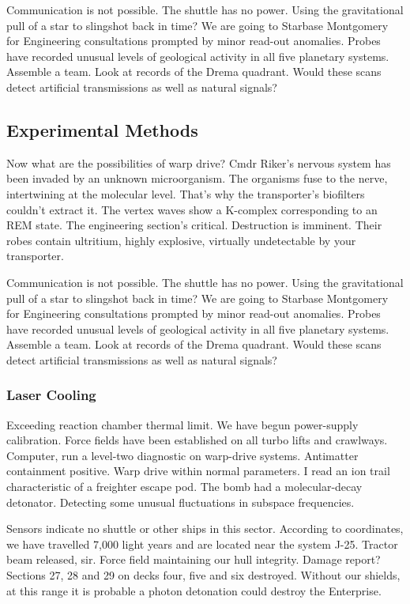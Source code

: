 Communication is not possible. The shuttle has no power. Using the gravitational pull of a star to slingshot back in time? We are going to Starbase Montgomery for Engineering consultations prompted by minor read-out anomalies. Probes have recorded unusual levels of geological activity in all five planetary systems. Assemble a team. Look at records of the Drema quadrant. Would these scans detect artificial transmissions as well as natural signals?

\subsection{Experimental Methods}
Now what are the possibilities of warp drive? Cmdr Riker's nervous system has been invaded by an unknown microorganism. The organisms fuse to the nerve, intertwining at the molecular level. That's why the transporter's biofilters couldn't extract it. The vertex waves show a K-complex corresponding to an REM state. The engineering section's critical. Destruction is imminent. Their robes contain ultritium, highly explosive, virtually undetectable by your transporter.

Communication is not possible. The shuttle has no power. Using the gravitational pull of a star to slingshot back in time? We are going to Starbase Montgomery for Engineering consultations prompted by minor read-out anomalies. Probes have recorded unusual levels of geological activity in all five planetary systems. Assemble a team. Look at records of the Drema quadrant. Would these scans detect artificial transmissions as well as natural signals?

\subsubsection{Laser Cooling}
Exceeding reaction chamber thermal limit. We have begun power-supply calibration. Force fields have been established on all turbo lifts and crawlways. Computer, run a level-two diagnostic on warp-drive systems. Antimatter containment positive. Warp drive within normal parameters. I read an ion trail characteristic of a freighter escape pod. The bomb had a molecular-decay detonator. Detecting some unusual fluctuations in subspace frequencies.

Sensors indicate no shuttle or other ships in this sector. According to coordinates, we have travelled 7,000 light years and are located near the system J-25. Tractor beam released, sir. Force field maintaining our hull integrity. Damage report? Sections 27, 28 and 29 on decks four, five and six destroyed. Without our shields, at this range it is probable a photon detonation could destroy the Enterprise.

